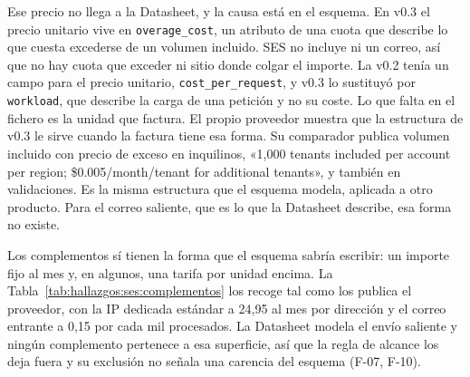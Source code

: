 Ese precio no llega a la Datasheet, y la causa está en el esquema. En v0.3 el
precio unitario vive en \texttt{overage\_cost}, un atributo de una cuota que
describe lo que cuesta excederse de un volumen incluido. SES no incluye ni un
correo, así que no hay cuota que exceder ni sitio donde colgar el importe. La
v0.2 tenía un campo para el precio unitario, \texttt{cost\_per\_request}, y
v0.3 lo sustituyó por \texttt{workload}, que describe la carga de una
petición y no su coste. Lo que falta en el fichero es la unidad que factura. El
propio proveedor muestra que la estructura de v0.3 le sirve cuando la
factura tiene esa forma. Su comparador publica volumen incluido con precio
de exceso en inquilinos, «1,000 tenants included per account per region;
\$0.005/month/tenant for additional tenants», y también en validaciones. Es la misma
estructura que el esquema modela, aplicada a otro producto. Para el correo
saliente, que es lo que la Datasheet describe, esa forma no existe.

Los complementos sí tienen la forma que el esquema sabría escribir: un
importe fijo al mes y, en algunos, una tarifa por unidad encima. La
Tabla~\ref{tab:hallazgos:ses:complementos} los recoge tal como los publica el
proveedor, con la IP dedicada estándar a 24,95 al mes por dirección y el
correo entrante a 0,15 por cada mil procesados. La Datasheet modela el envío saliente y
ningún complemento pertenece a esa superficie, así que la regla de alcance los
deja fuera y su exclusión no señala una carencia del esquema (F-07, F-10).

